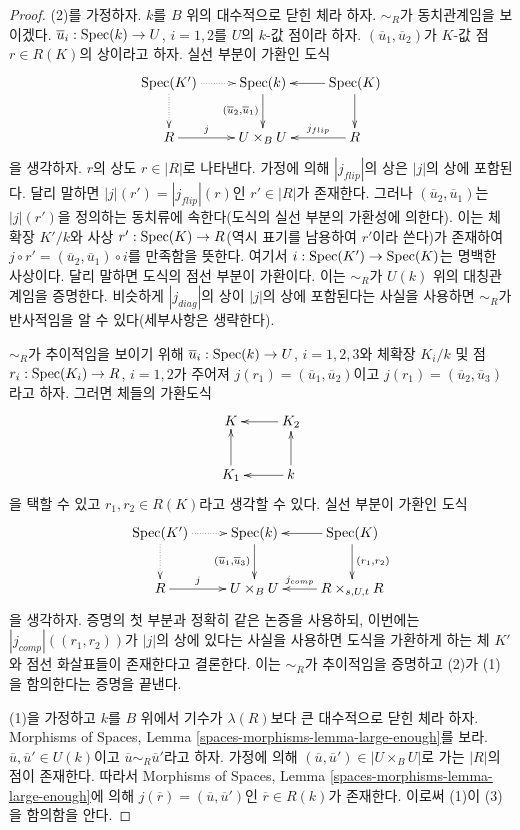 \begin{proof}
(2)를 가정하자. $k$를 $B$ 위의 대수적으로 닫힌 체라 하자.
$\sim_R$가 동치관계임을 보이겠다.
$\overline{u}_i : \mathop{\mathrm{Spec}}(k) \to U$, $i = 1, 2$를
$U$의 $k$-값 점이라 하자.
$(\overline{u}_1, \overline{u}_2)$가 $K$-값 점
$r \in R(K)$의 상이라고 하자. 실선 부분이 가환인 도식
$$
\xymatrix{
\Spec(K') \ar@{..>}[r] \ar@{..>}[d]
&
\Spec(k) \ar[d]_{(\overline{u}_2, \overline{u}_1)} &
\Spec(K) \ar[d] \ar[l] \\
R \ar[r]^-j &
U \times_B U &
R \ar[l]_-{j_{flip}}
}
$$
을 생각하자. $r$의 상도 $r \in |R|$로 나타낸다.
가정에 의해 $|j_{flip}|$의 상은 $|j|$의 상에 포함된다.
달리 말하면 $|j|(r') = |j_{flip}|(r)$인 $r' \in |R|$가 존재한다.
그러나 $(\overline{u}_2, \overline{u}_1)$는 $|j|(r')$을 정의하는
동치류에 속한다(도식의 실선 부분의 가환성에 의한다).
이는 체확장 $K'/k$와 사상
$r' : \mathop{\mathrm{Spec}}(K) \to R$(역시 표기를 남용하여 $r'$이라 쓴다)가 존재하여
$j \circ r' = (\overline{u}_2, \overline{u}_1) \circ i$를 만족함을 뜻한다.
여기서 $i : \mathop{\mathrm{Spec}}(K') \to \mathop{\mathrm{Spec}}(K)$는 명백한 사상이다.
달리 말하면 도식의 점선 부분이 가환이다. 이는 $\sim_R$가
$U(k)$ 위의 대칭관계임을 증명한다. 비슷하게 $|j_{diag}|$의 상이
$|j|$의 상에 포함된다는 사실을 사용하면 $\sim_R$가 반사적임을
알 수 있다(세부사항은 생략한다).

\medskip\noindent
$\sim_R$가 추이적임을 보이기 위해
$\overline{u}_i : \mathop{\mathrm{Spec}}(k) \to U$, $i = 1, 2, 3$와
체확장 $K_i/k$ 및 점
$r_i : \mathop{\mathrm{Spec}}(K_i) \to R$, $i = 1, 2$가 주어져
$j(r_1) = (\overline{u}_1, \overline{u}_2)$이고
$j(r_1) = (\overline{u}_2, \overline{u}_3)$라고 하자.
그러면 체들의 가환도식
$$
\xymatrix{
K & K_2 \ar[l] \\
K_1 \ar[u] & k \ar[l] \ar[u]
}
$$
을 택할 수 있고 $r_1, r_2 \in R(K)$라고 생각할 수 있다.
실선 부분이 가환인 도식
$$
\xymatrix{
\Spec(K') \ar@{..>}[r] \ar@{..>}[d]
&
\Spec(k) \ar[d]_{(\overline{u}_1, \overline{u}_3)} &
\Spec(K) \ar[d]^{(r_1, r_2)} \ar[l]
\\
R \ar[r]^-j &
U \times_B U &
R \times_{s, U, t} R \ar[l]_-{j_{comp}}
}
$$
을 생각하자. 증명의 첫 부분과 정확히 같은 논증을 사용하되,
이번에는 $|j_{comp}|((r_1, r_2))$가 $|j|$의 상에 있다는 사실을
사용하면 도식을 가환하게 하는 체 $K'$와 점선 화살표들이 존재한다고
결론한다. 이는 $\sim_R$가 추이적임을 증명하고 (2)가 (1)을
함의한다는 증명을 끝낸다.

\medskip\noindent
(1)을 가정하고 $k$를 $B$ 위에서 기수가 $\lambda(R)$보다 큰
대수적으로 닫힌 체라 하자. Morphisms of Spaces, Lemma
\ref{spaces-morphisms-lemma-large-enough}를 보라.
$\overline{u}, \overline{u}' \in U(k)$이고
$\overline{u} \sim_R \overline{u}'$라고 하자. 가정에 의해
$(\overline{u}, \overline{u}') \in |U \times_B U|$로 가는
$|R|$의 점이 존재한다. 따라서 Morphisms of Spaces, Lemma
\ref{spaces-morphisms-lemma-large-enough}에 의해
$j(\overline{r}) = (\overline{u}, \overline{u}')$인
$\overline{r} \in R(k)$가 존재한다. 이로써 (1)이 (3)을 함의함을 안다.


\end{proof}
